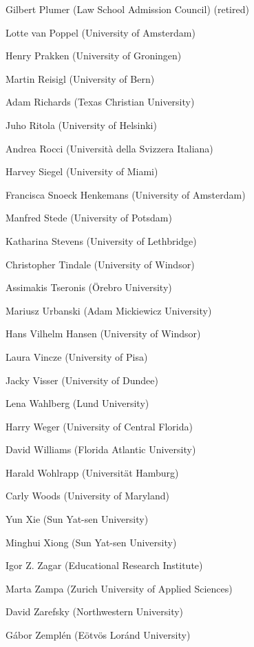 \begin{compactitem}[]
		\item[] Gilbert Plumer (Law School Admission Council) (retired)
		\item[] Lotte van Poppel (University of Amsterdam)
		\item[] Henry Prakken (University of Groningen)
		\item[] Martin Reisigl (University of Bern)
		\item[] Adam Richards (Texas Christian University)
		\item[] Juho Ritola (University of Helsinki)
		\item[] Andrea Rocci (Università della Svizzera Italiana)
		\item[] Harvey Siegel (University of Miami)
		\item[] Francisca Snoeck Henkemans (University of Amsterdam)
		\item[] Manfred Stede (University of Potsdam)
		\item[] Katharina Stevens (University of Lethbridge)
		\item[] Christopher Tindale (University of Windsor)
		\item[] Assimakis Tseronis (Örebro University)
		\item[] Mariusz Urbanski (Adam Mickiewicz University)
		\item[] Hans Vilhelm Hansen (University of Windsor)
		\item[] Laura Vincze (University of Pisa)
		\item[] Jacky Visser (University of Dundee)
		\item[] Lena Wahlberg (Lund University)
		\item[] Harry Weger (University of Central Florida)
		\item[] David Williams (Florida Atlantic University)
		\item[] Harald Wohlrapp (Universität Hamburg)
		\item[] Carly Woods (University of Maryland)
		\item[] Yun Xie (Sun Yat-sen University)
		\item[] Minghui Xiong (Sun Yat-sen University)
		\item[] Igor Z. Zagar (Educational Research Institute)
		\item[] Marta Zampa (Zurich University of Applied Sciences)
		\item[] David Zarefsky (Northwestern University)
		\item[] Gábor Zemplén (Eötvös Loránd University)
	\end{compactitem}
